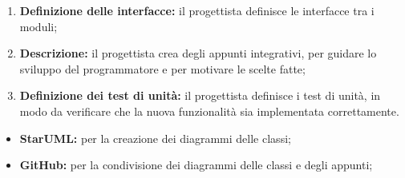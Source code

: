\begin{itemize}
\begin{enumerate}
		      \item \textbf{Definizione delle interfacce:} il
		            progettista definisce le interfacce tra i moduli;

		      \item \textbf{Descrizione:} il progettista crea degli appunti
		            integrativi, per guidare lo sviluppo del programmatore e
		            per motivare le scelte fatte;

		      \item \textbf{Definizione dei test di unità:} il progettista
		            definisce i test di unità, in modo da verificare che la
		            nuova funzionalità sia implementata correttamente.
	      \end{enumerate}
\end{itemize}

\begin{itemize}
	\item \textbf{StarUML:} per la creazione dei diagrammi delle classi;
	\item \textbf{GitHub\g:} per la condivisione dei diagrammi delle classi e
	      degli appunti;
\end{itemize}

